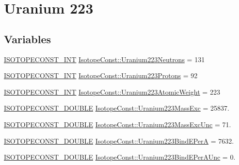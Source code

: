 \hypertarget{group___isotope_const-_uranium-_u223}{}\section{Uranium 223}
\label{group___isotope_const-_uranium-_u223}
\subsection*{Variables}
\begin{DoxyCompactItemize}
\item 
\mbox{\hyperlink{group___isotope_const-_macros_ga5f18360b3e99483a35c32d789e62621c}{I\+S\+O\+T\+O\+P\+E\+C\+O\+N\+S\+T\+\_\+\+I\+NT}} \mbox{\hyperlink{group___isotope_const-_uranium-_u223_gac98612deeb200fbc8db090d5d493dd07}{Isotope\+Const\+::\+Uranium223\+Neutrons}} = 131
\item 
\mbox{\hyperlink{group___isotope_const-_macros_ga5f18360b3e99483a35c32d789e62621c}{I\+S\+O\+T\+O\+P\+E\+C\+O\+N\+S\+T\+\_\+\+I\+NT}} \mbox{\hyperlink{group___isotope_const-_uranium-_u223_ga871595bcd29d118a6274d8a52c913369}{Isotope\+Const\+::\+Uranium223\+Protons}} = 92
\item 
\mbox{\hyperlink{group___isotope_const-_macros_ga5f18360b3e99483a35c32d789e62621c}{I\+S\+O\+T\+O\+P\+E\+C\+O\+N\+S\+T\+\_\+\+I\+NT}} \mbox{\hyperlink{group___isotope_const-_uranium-_u223_gac921136c1af6b40627f9813215402377}{Isotope\+Const\+::\+Uranium223\+Atomic\+Weight}} = 223
\item 
\mbox{\hyperlink{group___isotope_const-_macros_ga8f45a7272ce02c0b4c65c44636ed719a}{I\+S\+O\+T\+O\+P\+E\+C\+O\+N\+S\+T\+\_\+\+D\+O\+U\+B\+LE}} \mbox{\hyperlink{group___isotope_const-_uranium-_u223_ga9acac418d85cd118f4bc971bccd38603}{Isotope\+Const\+::\+Uranium223\+Mass\+Exc}} = 25837.
\item 
\mbox{\hyperlink{group___isotope_const-_macros_ga8f45a7272ce02c0b4c65c44636ed719a}{I\+S\+O\+T\+O\+P\+E\+C\+O\+N\+S\+T\+\_\+\+D\+O\+U\+B\+LE}} \mbox{\hyperlink{group___isotope_const-_uranium-_u223_ga2aaaa7668f010ac54a89a44bed82910b}{Isotope\+Const\+::\+Uranium223\+Mass\+Exc\+Unc}} = 71.
\item 
\mbox{\hyperlink{group___isotope_const-_macros_ga8f45a7272ce02c0b4c65c44636ed719a}{I\+S\+O\+T\+O\+P\+E\+C\+O\+N\+S\+T\+\_\+\+D\+O\+U\+B\+LE}} \mbox{\hyperlink{group___isotope_const-_uranium-_u223_gaaed45d024e10ac5d36c4f28a8e29d43d}{Isotope\+Const\+::\+Uranium223\+Bind\+E\+PerA}} = 7632.
\item 
\mbox{\hyperlink{group___isotope_const-_macros_ga8f45a7272ce02c0b4c65c44636ed719a}{I\+S\+O\+T\+O\+P\+E\+C\+O\+N\+S\+T\+\_\+\+D\+O\+U\+B\+LE}} \mbox{\hyperlink{group___isotope_const-_uranium-_u223_ga544c9941f799ba77b918c0a61fd5df3c}{Isotope\+Const\+::\+Uranium223\+Bind\+E\+Per\+A\+Unc}} = 0.

\end{DoxyCompactItemize}
